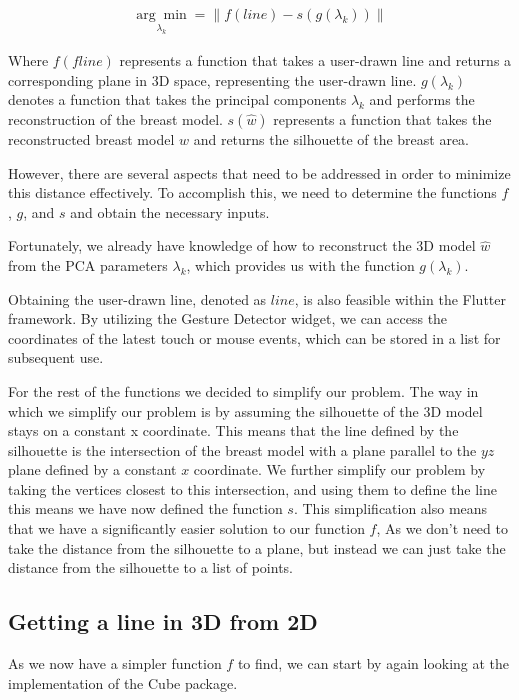 \begin{align}\label{argmin:full}
    \underset{\lambda_k}{\arg\min} = \lVert f(line) - s(g(\lambda_k)) \rVert
\end{align}

Where $f(f{line})$ represents a function that takes a user-drawn line and returns a corresponding plane in 3D space, representing the user-drawn line. $g(\lambda_k)$ denotes a function 
that takes the principal components $\lambda_k$ and performs the reconstruction of the breast model. $s(\hat{w})$ represents a function that takes the reconstructed breast model $\hat{w}$ 
and returns the silhouette of the breast area.

However, there are several aspects that need to be addressed in order to minimize this distance effectively. To accomplish this, we need to determine the functions $f$, $g$, and $s$ and 
obtain the necessary inputs.

Fortunately, we already have knowledge of how to reconstruct the 3D model $\hat{w}$ from the PCA parameters $\lambda_k$, which provides us with the function $g(\lambda_k)$.

Obtaining the user-drawn line, denoted as $line$, is also feasible within the Flutter framework. By utilizing the Gesture Detector widget, we can access the coordinates of the latest 
touch or mouse events, which can be stored in a list for subsequent use.

For the rest of the functions we decided to simplify our problem. The way in which we simplify our problem is by assuming the silhouette of the 3D model stays on a constant x coordinate. This means
that the line defined by the silhouette is the intersection of the breast model with a plane parallel to the $yz$ plane defined by a constant $x$ coordinate. We further simplify our problem by 
taking the vertices closest to this intersection, and using them to define the line this means we have now defined the function $s$. This simplification also means that we have a significantly
easier solution to our function $f$, As we don't need to take the distance from the silhouette to a plane, but instead we can just take the distance from the silhouette to a list of points.

\subsection{Getting a line in 3D from 2D}

As we now have a simpler function $f$ to find, we can start by again looking at the implementation of the Cube package. 

